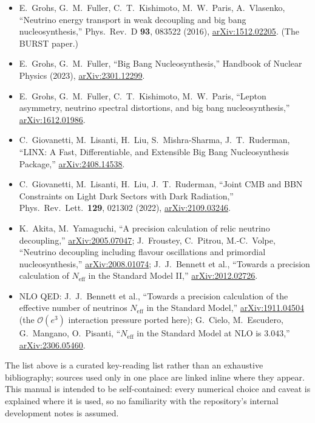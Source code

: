 \documentclass[11pt]{article}
\newcommand{\Neff}{N_{\mathrm{eff}}}
\begin{document}
\begin{itemize}[nosep]
\item E.~Grohs, G.~M.~Fuller, C.~T.~Kishimoto, M.~W.~Paris, A.~Vlasenko,
  ``Neutrino energy transport in weak decoupling and big bang nucleosynthesis,''
  Phys.\ Rev.\ D \textbf{93}, 083522 (2016),
  \href{https://arxiv.org/abs/1512.02205}{arXiv:1512.02205}. (The BURST paper.)
\item E.~Grohs, G.~M.~Fuller, ``Big Bang Nucleosynthesis,'' Handbook of Nuclear
  Physics (2023), \href{https://arxiv.org/abs/2301.12299}{arXiv:2301.12299}.
\item E.~Grohs, G.~M.~Fuller, C.~T.~Kishimoto, M.~W.~Paris, ``Lepton asymmetry,
  neutrino spectral distortions, and big bang nucleosynthesis,''
  \href{https://arxiv.org/abs/1612.01986}{arXiv:1612.01986}.
\item C.~Giovanetti, M.~Lisanti, H.~Liu, S.~Mishra-Sharma, J.~T.~Ruderman,
  ``LINX: A Fast, Differentiable, and Extensible Big Bang Nucleosynthesis
  Package,'' \href{https://arxiv.org/abs/2408.14538}{arXiv:2408.14538}.
\item C.~Giovanetti, M.~Lisanti, H.~Liu, J.~T.~Ruderman, ``Joint CMB and BBN
  Constraints on Light Dark Sectors with Dark Radiation,'' Phys.\ Rev.\ Lett.\
  \textbf{129}, 021302 (2022),
  \href{https://arxiv.org/abs/2109.03246}{arXiv:2109.03246}.
\item K.~Akita, M.~Yamaguchi, ``A precision calculation of relic neutrino
  decoupling,'' \href{https://arxiv.org/abs/2005.07047}{arXiv:2005.07047};
  J.~Froustey, C.~Pitrou, M.-C.~Volpe, ``Neutrino decoupling including flavour
  oscillations and primordial nucleosynthesis,''
  \href{https://arxiv.org/abs/2008.01074}{arXiv:2008.01074};
  J.~J.~Bennett et al., ``Towards a precision calculation of $\Neff$ in the
  Standard Model II,'' \href{https://arxiv.org/abs/2012.02726}{arXiv:2012.02726}.
\item NLO QED: J.~J.~Bennett et al., ``Towards a precision calculation of the
  effective number of neutrinos $\Neff$ in the Standard Model,''
  \href{https://arxiv.org/abs/1911.04504}{arXiv:1911.04504} (the $\mathcal O(e^3)$
  interaction pressure ported here); G.~Cielo, M.~Escudero, G.~Mangano,
  O.~Pisanti, ``$\Neff$ in the Standard Model at NLO is $3.043$,''
  \href{https://arxiv.org/abs/2306.05460}{arXiv:2306.05460}.
\end{itemize}

The list above is a curated key-reading list rather than an exhaustive
bibliography; sources used only in one place are linked inline where they appear.
This manual is intended to be self-contained: every numerical choice and caveat
is explained where it is used, so no familiarity with the repository's internal
development notes is assumed.
\end{document}
